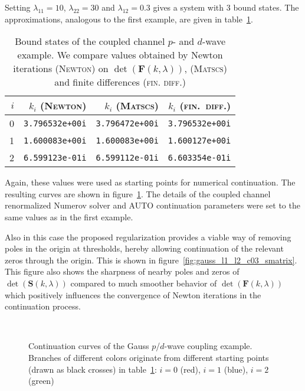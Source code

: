 \documentclass[mathpazo]{cicp}
\begin{document}
Setting $\lambda_{11}=10$, $\lambda_{22}=30$ and $\lambda_{12}=0.3$ gives a system with 3 bound states. The approximations, analogous to the first example, are given in table~\ref{tab:gauss_l1_l2_c03_bs}.
\begin{table}[h!]
	\centering
	\begin{tabular}{r|r|r|r}
		$i$ & $k_{i}$ (\textsc{Newton}) & $k_{i}$ (\textsc{Matscs}) & $k_{i}$ (\textsc{fin.\ diff.}) \\
		\hline
		0 & \texttt{3.796532e+00i} & \texttt{3.796472e+00i} & \texttt{3.796532e+00i} \\
		1 & \texttt{1.600083e+00i} & \texttt{1.600083e+00i} & \texttt{1.600127e+00i} \\
		2 & \texttt{6.599123e-01i} & \texttt{6.599112e-01i} & \texttt{6.603354e-01i}
	\end{tabular}
	\caption{Bound states of the coupled channel $p$- and $d$-wave example. We compare values obtained by Newton iterations (\textsc{Newton}) on $\det(\mathbold{F}(k,\lambda))$, (\textsc{Matscs}) and finite differences (\textsc{fin. diff.})}
	\label{tab:gauss_l1_l2_c03_bs}
\end{table}

Again, these values were used as starting points for numerical continuation. The resulting curves are shown in figure~\ref{fig:gauss_l1_l2_c03_continuation}. The details of the coupled channel renormalized Numerov solver and AUTO continuation parameters were set to the same values as in the first example.

Also in this case the proposed regularization provides a viable way of removing poles in the origin at thresholds, hereby allowing continuation of the relevant zeros through the origin. This is shown in figure~\ref{fig:gauss_l1_l2_c03_smatrix}. This figure also shows the sharpness of nearby poles and zeros of $\det(\mathbold{S}(k,\lambda))$ compared to much smoother behavior of $\det(\mathbold{F}(k,\lambda))$ which positively influences the convergence of Newton iterations in the continuation process.

\begin{figure}[h!]
	\centering
	\\
	\caption{Continuation curves of the Gauss $p$/$d$-wave coupling example. Branches of different colors originate from different starting points 
	(drawn as black crosses) in table~\ref{tab:gauss_l1_l2_c03_bs}: $i=0$ (red), $i=1$ (blue), $i=2$ (green)}
	\label{fig:gauss_l1_l2_c03_continuation}
\end{figure}
\end{document}

